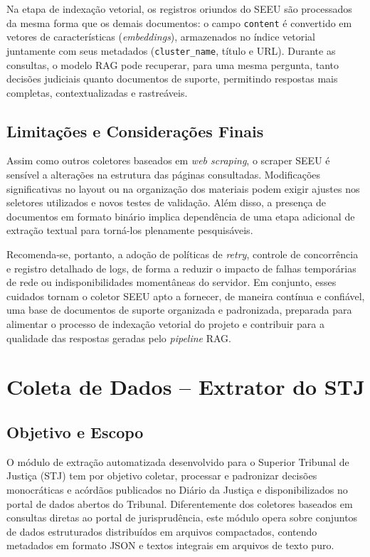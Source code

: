 Na etapa de indexação vetorial, os registros oriundos do SEEU são processados da mesma forma que os demais documentos: o campo \texttt{content} é convertido em vetores de características (\textit{embeddings}), armazenados no índice vetorial juntamente com seus metadados (\texttt{cluster\_name}, título e URL). Durante as consultas, o modelo RAG pode recuperar, para uma mesma pergunta, tanto decisões judiciais quanto documentos de suporte, permitindo respostas mais completas, contextualizadas e rastreáveis.

\subsection{Limitações e Considerações Finais}
Assim como outros coletores baseados em \textit{web scraping}, o scraper SEEU é sensível a alterações na estrutura das páginas consultadas. Modificações significativas no layout ou na organização dos materiais podem exigir ajustes nos seletores utilizados e novos testes de validação. Além disso, a presença de documentos em formato binário implica dependência de uma etapa adicional de extração textual para torná-los plenamente pesquisáveis.

Recomenda-se, portanto, a adoção de políticas de \textit{retry}, controle de concorrência e registro detalhado de logs, de forma a reduzir o impacto de falhas temporárias de rede ou indisponibilidades momentâneas do servidor. Em conjunto, esses cuidados tornam o coletor SEEU apto a fornecer, de maneira contínua e confiável, uma base de documentos de suporte organizada e padronizada, preparada para alimentar o processo de indexação vetorial do projeto e contribuir para a qualidade das respostas geradas pelo \textit{pipeline} RAG.

\section{Coleta de Dados -- Extrator do STJ}
\label{sec:stj_scraper}

\subsection{Objetivo e Escopo}
O módulo de extração automatizada desenvolvido para o Superior Tribunal de Justiça (STJ) tem por objetivo coletar, processar e padronizar decisões monocráticas e acórdãos publicados no Diário da Justiça e disponibilizados no portal de dados abertos do Tribunal. Diferentemente dos coletores baseados em consultas diretas ao portal de jurisprudência, este módulo opera sobre conjuntos de dados estruturados distribuídos em arquivos compactados, contendo metadados em formato JSON e textos integrais em arquivos de texto puro.


